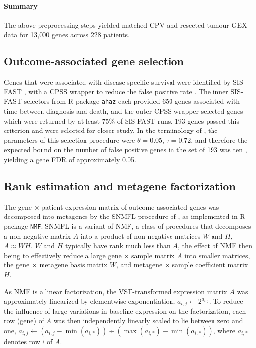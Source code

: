 \documentclass[dissertation.tex]{subfiles}
\begin{document}
\paragraph{Summary}
The above preprocessing steps yielded matched \gls{CPV} and resected tumour \gls{GEX} data for 13,000 genes across 228 patients.

\subsection{Outcome-associated gene selection}
Genes that were associated with disease-specific survival were identified by \gls{SIS}-\gls{FAST} \cite{Gorst-Rasmussen2013}, with a \gls{CPSS} wrapper to reduce the false positive rate \cite{Shah2013}.  The inner \gls{SIS}-\gls{FAST} selectors from R package \texttt{ahaz} each provided 650 genes associated with time between diagnosis and death, and the outer \gls{CPSS} wrapper selected genes which were returned by at least 75\% of \gls{SIS}-\gls{FAST} runs.  193 genes passed this criterion and were selected for closer study.  
In the terminology of \cite{Shah2013}, the parameters of this selection procedure were $\theta = 0.05$, $\tau = 0.72$, and therefore the expected bound on the number of false positive genes in the set of 193 was ten \cite[table 1]{Shah2013}, yielding a gene \gls{FDR} of approximately 0.05.

\subsection{Rank estimation and metagene factorization}
\label{subsec:signatures-nmf}
The gene $\times$ patient expression matrix of outcome-associated genes was decomposed into metagenes by the \gls{SNMFL} procedure of \cite{Kim2007}, as implemented in R package \texttt{NMF}.  \gls{SNMFL} is a variant of \gls{NMF}, a class of procedures that decomposes a non-negative matrix $A$ into a product of non-negative matrices $W$ and $H$, $A \approx WH$.  $W$ and $H$ typically have rank much less than $A$, the effect of \gls{NMF} then being to effectively reduce a large gene $\times$ sample matrix $A$ into smaller matrices, the gene $\times$ metagene basis matrix $W$, and metagene $\times$ sample coefficient matrix $H$.

As \gls{NMF} is a linear factorization, the \gls{VST}-transformed expression matrix $A$ was approximately linearized by elementwise exponentiation, $a_{i,j} \leftarrow 2^{a_{i,j}}$.  To reduce the influence of large variations in baseline expression on the factorization, each row (gene) of $A$ was then independently linearly scaled to lie between zero and one, $a_{i,j} \leftarrow (a_{i,j} - \min(a_{i,*})) \div (\max(a_{i,*}) - \min(a_{i,*}))$, where $a_{i,*}$ denotes row $i$ of $A$.
\end{document}
